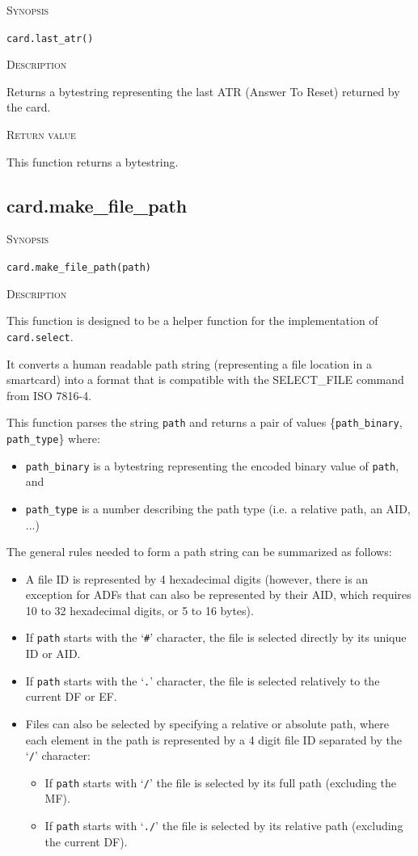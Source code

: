 \documentclass[11pt]{report}
\newcommand{\mansection}[1]{\vspace{0.5em}\par\noindent\textsc{#1}\vspace{0.5em}\par}
\newcommand{\syn}[1]{\texttt{#1}}
\begin{document}
\mansection{Synopsis}
\syn{card.last\_atr()}

\mansection{Description}
  Returns a bytestring representing the last ATR (Answer To Reset) returned by the card.

\mansection{Return value}
  This function returns a bytestring.

\subsection{card.make\_file\_path}

\mansection{Synopsis}
\syn{card.make\_file\_path(path)}

\mansection{Description}
  This function is designed to be a helper function for the implementation of \syn{card.select}.

  It converts a human readable path string (representing a file location in
  a smartcard) into a format that is compatible with the SELECT\_FILE command from ISO 7816-4.

  This function parses the string \syn{path} and returns a pair of values \{\syn{path\_binary}, \syn{path\_type}\}
  where:
  \begin{itemize}
  \item{\syn{path\_binary} is a bytestring representing the encoded binary value of \syn{path}, and}
  \item{\syn{path\_type} is a number describing the path type (i.e. a relative path, an AID, ...)}
  \end{itemize}

  The general rules needed to form a path string can be summarized as follows:
  \begin{itemize}
  \item{A file ID is represented by 4 hexadecimal digits 
    (however, there is an exception for ADFs that can also be represented by their AID, 
     which requires 10 to 32 hexadecimal digits, or 5 to 16 bytes).}
  \item{If \syn{path} starts with the `\syn{\#}' character, the file is selected directly by its unique ID or AID.}
  \item{If \syn{path} starts with the `\syn{.}' character, the file is selected relatively to the current DF or EF.}
  \item{Files can also be selected by specifying a relative or absolute path, 
    where each element in the path is represented by a 4 digit file ID separated by the `\syn{/}' character:}
     \begin{itemize}
     \item{If \syn{path} starts with `\syn{/}' the file is selected by its full path (excluding the MF).}
     \item{If \syn{path} starts with `\syn{./}' the file is selected by its relative path (excluding the current DF).}
     \end{itemize}
  \end{itemize}
\end{document}
